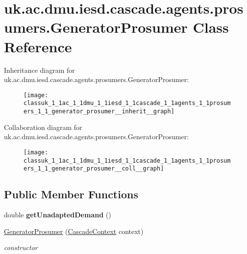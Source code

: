 \hypertarget{classuk_1_1ac_1_1dmu_1_1iesd_1_1cascade_1_1agents_1_1prosumers_1_1_generator_prosumer}{\section{uk.\-ac.\-dmu.\-iesd.\-cascade.\-agents.\-prosumers.\-Generator\-Prosumer Class Reference}
\label{classuk_1_1ac_1_1dmu_1_1iesd_1_1cascade_1_1agents_1_1prosumers_1_1_generator_prosumer}
}


Inheritance diagram for uk.\-ac.\-dmu.\-iesd.\-cascade.\-agents.\-prosumers.\-Generator\-Prosumer\-:\nopagebreak
\begin{figure}[H]
\begin{center}
\leavevmode
\texttt{[image: classuk\_1\_1ac\_1\_1dmu\_1\_1iesd\_1\_1cascade\_1\_1agents\_1\_1prosumers\_1\_1\_generator\_prosumer\_\_inherit\_\_graph]}
\end{center}
\end{figure}


Collaboration diagram for uk.\-ac.\-dmu.\-iesd.\-cascade.\-agents.\-prosumers.\-Generator\-Prosumer\-:\nopagebreak
\begin{figure}[H]
\begin{center}
\leavevmode
\texttt{[image: classuk\_1\_1ac\_1\_1dmu\_1\_1iesd\_1\_1cascade\_1\_1agents\_1\_1prosumers\_1\_1\_generator\_prosumer\_\_coll\_\_graph]}
\end{center}
\end{figure}
\subsection*{Public Member Functions}
\begin{DoxyCompactItemize}
\item 
\hypertarget{classuk_1_1ac_1_1dmu_1_1iesd_1_1cascade_1_1agents_1_1prosumers_1_1_generator_prosumer_abb92ef85798393c6de7374fdd73c1e6b}{double {\bfseries get\-Unadapted\-Demand} ()}\label{classuk_1_1ac_1_1dmu_1_1iesd_1_1cascade_1_1agents_1_1prosumers_1_1_generator_prosumer_abb92ef85798393c6de7374fdd73c1e6b}

\item 
\hypertarget{classuk_1_1ac_1_1dmu_1_1iesd_1_1cascade_1_1agents_1_1prosumers_1_1_generator_prosumer_a69848bbd7c1b71f431b8c9849c175b5f}{\hyperlink{classuk_1_1ac_1_1dmu_1_1iesd_1_1cascade_1_1agents_1_1prosumers_1_1_generator_prosumer_a69848bbd7c1b71f431b8c9849c175b5f}{Generator\-Prosumer} (\hyperlink{classuk_1_1ac_1_1dmu_1_1iesd_1_1cascade_1_1context_1_1_cascade_context}{Cascade\-Context} context)}\label{classuk_1_1ac_1_1dmu_1_1iesd_1_1cascade_1_1agents_1_1prosumers_1_1_generator_prosumer_a69848bbd7c1b71f431b8c9849c175b5f}

\begin{DoxyCompactList}\small\item\em constructor \end{DoxyCompactList}\end{DoxyCompactItemize}
